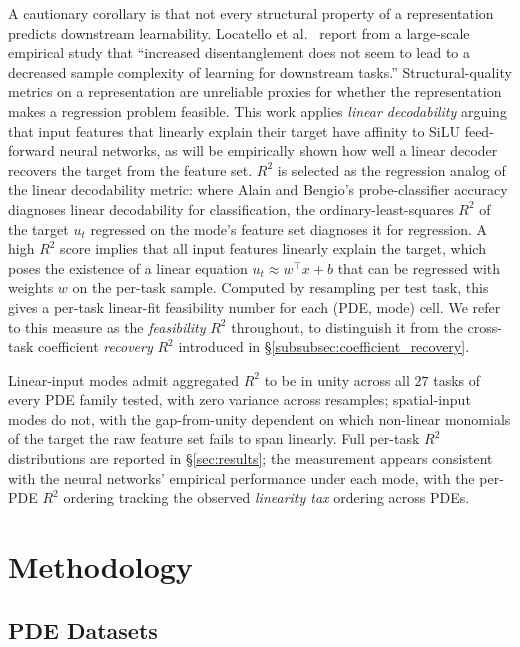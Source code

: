 \documentclass[10pt,journal,compsoc]{IEEEtran}
\begin{document}
A cautionary corollary is that not every structural property of a
representation predicts downstream learnability. Locatello et
al.~\cite{locatello2019} report from a large-scale empirical study that
``increased disentanglement does not seem to lead to a decreased sample
complexity of learning for downstream tasks.'' Structural-quality metrics on
a representation are unreliable proxies for whether the representation makes
a regression problem feasible. This work applies \emph{linear decodability}
arguing that input features that linearly explain their target have affinity to SiLU feed-forward neural networks, as will
be empirically shown how well a linear decoder recovers the target from the feature set. $R^2$ is
selected as the regression analog of the linear decodability metric: where
Alain and Bengio's probe-classifier accuracy diagnoses linear decodability
for classification, the ordinary-least-squares $R^2$ of the target $u_t$
regressed on the mode's feature set diagnoses it for regression. A high
$R^2$ score implies that all input features linearly explain the target,
which poses the existence of a linear equation $u_t \approx w^\top x + b$
that can be regressed with weights $w$ on the per-task sample. Computed
by resampling per test task, this gives a per-task linear-fit feasibility
number for each (PDE, mode) cell. We refer to this measure as the
\emph{feasibility} $R^2$ throughout, to distinguish it from the cross-task
coefficient \emph{recovery} $R^2$ introduced in
\S\ref{subsubsec:coefficient_recovery}.

Linear-input modes admit aggregated $R^2$ to be in unity across all $27$ tasks of
every PDE family tested, with zero variance across resamples; spatial-input
modes do not, with the gap-from-unity dependent on which non-linear monomials
of the target the raw feature set fails to span linearly. Full per-task
$R^2$ distributions are reported in \S\ref{sec:results}; the measurement
appears consistent with the neural networks' empirical performance under
each mode, with the per-PDE $R^2$ ordering tracking the observed
\emph{linearity tax} ordering across PDEs.

\section{Methodology}\label{sec:methodology}

\subsection{PDE Datasets}\label{subsec:pde_datasets}
\end{document}
